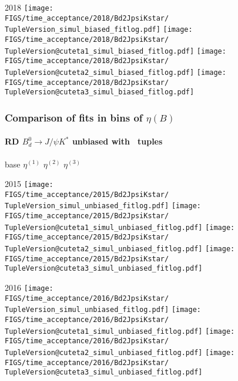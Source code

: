 \begin{frame}
  2018
  \texttt{[image: \\FIGS/time\_acceptance/2018/Bd2JpsiKstar/\\TupleVersion\_simul\_biased\_fitlog.pdf]}
  \texttt{[image: \\FIGS/time\_acceptance/2018/Bd2JpsiKstar/\\TupleVersion@cuteta1\_simul\_biased\_fitlog.pdf]}
  \texttt{[image: \\FIGS/time\_acceptance/2018/Bd2JpsiKstar/\\TupleVersion@cuteta2\_simul\_biased\_fitlog.pdf]}
  \texttt{[image: \\FIGS/time\_acceptance/2018/Bd2JpsiKstar/\\TupleVersion@cuteta3\_simul\_biased\_fitlog.pdf]}

\end{frame} %



\begin{frame} %
\frametitle{Comparison of fits in bins of $\eta(B)$}
\framesubtitle{RD $B_d^0\rightarrow J/\psi K^*$ unbiased with \TupleVersion\, tuples}

  \phantom{2020} base \hspace*{1.5cm} $\eta^{(1)}$ \hspace*{1.5cm} $\eta^{(2)}$ \hspace*{1.5cm} $\eta^{(3)}$

  2015
  \texttt{[image: \\FIGS/time\_acceptance/2015/Bd2JpsiKstar/\\TupleVersion\_simul\_unbiased\_fitlog.pdf]}
  \texttt{[image: \\FIGS/time\_acceptance/2015/Bd2JpsiKstar/\\TupleVersion@cuteta1\_simul\_unbiased\_fitlog.pdf]}
  \texttt{[image: \\FIGS/time\_acceptance/2015/Bd2JpsiKstar/\\TupleVersion@cuteta2\_simul\_unbiased\_fitlog.pdf]}
  \texttt{[image: \\FIGS/time\_acceptance/2015/Bd2JpsiKstar/\\TupleVersion@cuteta3\_simul\_unbiased\_fitlog.pdf]}
  \vspace*{2mm}

  2016
  \texttt{[image: \\FIGS/time\_acceptance/2016/Bd2JpsiKstar/\\TupleVersion\_simul\_unbiased\_fitlog.pdf]}
  \texttt{[image: \\FIGS/time\_acceptance/2016/Bd2JpsiKstar/\\TupleVersion@cuteta1\_simul\_unbiased\_fitlog.pdf]}
  \texttt{[image: \\FIGS/time\_acceptance/2016/Bd2JpsiKstar/\\TupleVersion@cuteta2\_simul\_unbiased\_fitlog.pdf]}
  \texttt{[image: \\FIGS/time\_acceptance/2016/Bd2JpsiKstar/\\TupleVersion@cuteta3\_simul\_unbiased\_fitlog.pdf]}
  \vspace*{2mm}


\end{frame}
